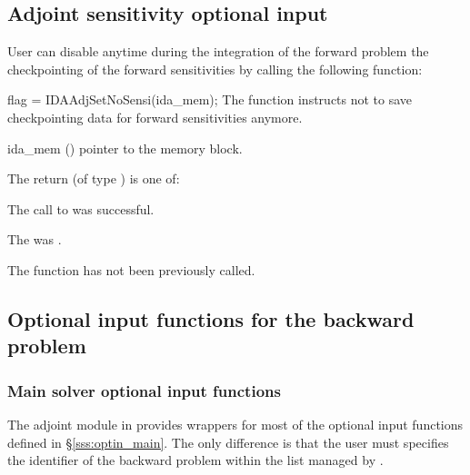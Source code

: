 \subsection{Adjoint sensitivity optional input}

User can disable anytime during the integration of the forward problem the 
checkpointing of the forward sensitivities by calling the following function:

{
  flag = IDAAdjSetNoSensi(ida\_mem);
}
{
  The function  instructs  not
  to save checkpointing data for forward sensitivities anymore.
}
{
  \begin{args}
  \item[ida\_mem] ()
    pointer to the {\idas}  memory block.
  \end{args}
}
{
  The return  (of type ) is one of:
  \begin{args}
  \item[\Id{IDA\_SUCCESS}]
    The call to  was successful.
  \item[\Id{IDA\_MEM\_NULL}]
    The  was .
  \item[\Id{IDA\_NO\_ADJ}]
    The function  has not been previously called.
  \end{args}
}
{}


\subsection{Optional input functions for the backward problem}
\label{ss:optional_input_b}
\subsubsection{Main solver optional input functions}

The adjoint module in {\idas} provides wrappers for most of the optional 
input functions defined in \S\ref{sss:optin_main}. The only difference is 
that the user must specifies the identifier  of the backward problem 
within the list managed by {\idas}. 

